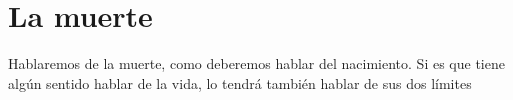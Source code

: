\chapter{La muerte}

Hablaremos de la muerte, como deberemos hablar del nacimiento. Si es que tiene algún sentido hablar de la vida, lo tendrá también hablar de sus dos límites

\lipsum